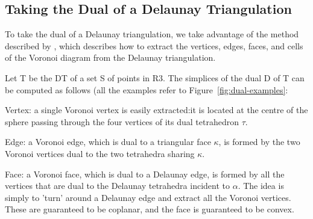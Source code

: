\documentclass{article}
\begin{document}
\subsection{Taking the Dual of a Delaunay Triangulation}
To take the dual of a Delaunay triangulation, we take advantage of the method described by \cite{delaunay_to_voronoi}, which describes how to extract the vertices, edges, faces, and cells of the Voronoi diagram from the Delaunay triangulation.

Let T be the DT of a set S of points in R3. The simplices of the dual D of T can be computed as follows (all the examples refer to Figure~\ref{fig:dual-examples}:

Vertex: a single Voronoi vertex is easily extracted:it is located at the centre of the sphere passing through the four vertices of its dual tetrahedron $\tau$.

Edge: a Voronoi edge, which is dual to a triangular face $\kappa$, is formed by the two Voronoi vertices dual to the two tetrahedra sharing $\kappa$.

Face: a Voronoi face, which is dual to a Delaunay edge, is formed by all the vertices that are dual to the Delaunay tetrahedra incident to $\alpha$. The idea is simply to 'turn' around a Delaunay edge and extract all the Voronoi vertices. These are guaranteed to be coplanar, and the face is guaranteed to be convex.
\end{document}
